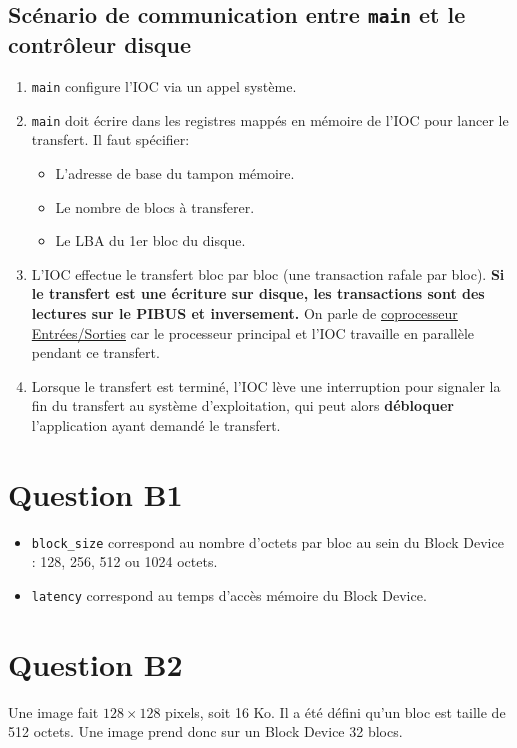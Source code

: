 \documentclass[10pt]{article}
\begin{document}
\subsection{Scénario de communication entre \texttt{main} et le contrôleur disque}
\begin{enumerate}
  \item \texttt{main} configure l'IOC via un appel système.
  \item \texttt{main} doit écrire dans les registres mappés en mémoire de l'IOC
  pour lancer le transfert. Il faut spécifier:
  \begin{itemize}
    \item L'adresse de base du tampon mémoire.
    \item Le nombre de blocs à transferer.
    \item Le LBA du 1er bloc du disque.
  \end{itemize}
  \item L'IOC effectue le transfert bloc par bloc (une transaction rafale par
  bloc). \textbf{Si le transfert est une écriture sur disque, les transactions
  sont des lectures sur le PIBUS et inversement.} On parle de \underline{
  coprocesseur Entrées/Sorties} car le processeur principal et l'IOC travaille
  en parallèle pendant ce transfert.
  \item Lorsque le transfert est terminé, l'IOC lève une interruption pour
  signaler la fin du transfert au système d'exploitation, qui peut alors
  {\bf débloquer} l'application ayant demandé le transfert.
\end{enumerate}
\newpage
\section{Question B1}
\begin{itemize}
  \item \texttt{block\_size} correspond au nombre d'octets par bloc au sein du
  Block Device : 128, 256, 512 ou 1024 octets.
  \item \texttt{latency} correspond au temps d'accès mémoire du Block Device.
\end{itemize}

\section{Question B2}
Une image fait $128\times128$ pixels, soit 16 Ko. Il a été défini qu'un bloc est
taille de 512 octets. Une image prend donc sur un Block Device 32 blocs.
\end{document}
